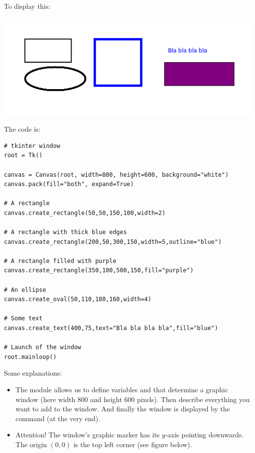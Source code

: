 \documentclass[11pt,class=report,crop=false]{standalone}
\begin{document}
\begin{cours}


To display this:
\begin{center}
\includegraphics[scale=\myscale,scale=0.6]{screen-stat-lesson-intro}
\end{center}
The code is:
\begin{lstlisting}
# tkinter window
root = Tk()
        
canvas = Canvas(root, width=800, height=600, background="white")
canvas.pack(fill="both", expand=True)

# A rectangle
canvas.create_rectangle(50,50,150,100,width=2)

# A rectangle with thick blue edges
canvas.create_rectangle(200,50,300,150,width=5,outline="blue")

# A rectangle filled with purple
canvas.create_rectangle(350,100,500,150,fill="purple")

# An ellipse
canvas.create_oval(50,110,180,160,width=4)

# Some text
canvas.create_text(400,75,text="Bla bla bla bla",fill="blue")

# Launch of the window
root.mainloop()
\end{lstlisting}


Some explanations:
\begin{itemize}
  \item The  module allows us to define variables  and  that determine a graphic window (here width $800$ and height $600$ pixels).
  Then describe everything you want to add to the window. And finally the window is displayed by the command  (at the very end). 
  
    
  \item Attention! The window's graphic marker has its $y$-axis pointing downwards. The origin $(0,0)$ is the top left corner (see figure below). 
  

\end{itemize}
\end{cours}
\end{document}
